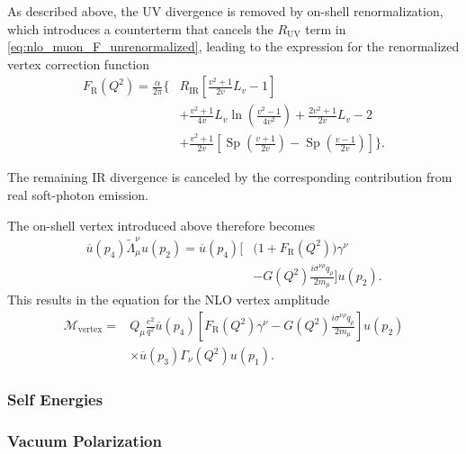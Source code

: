 As described above, the UV divergence is removed by on-shell renormalization, which introduces a counterterm that cancels the $R_{\mathrm{UV}}$ term in \autoref{eq:nlo_muon_F_unrenormalized}, leading to the expression for the renormalized vertex correction function 
\begin{equation}
\begin{split}
  F_{\mathrm R}(Q^2)=\frac{\alpha}{2\pi}\Bigg\{&
    R_{\mathrm{IR}}\left[
    \frac{v^2+1}{2v}L_v-1\right]\\
  &+\frac{v^2+1}{4v}L_v
    \ln\!\left(\frac{v^2-1}{4v^2}\right)
    +\frac{2v^2+1}{2v}L_v-2\\
  &+\frac{v^2+1}{2v}\left[
    \operatorname{Sp}\!\left(\frac{v+1}{2v}\right)
    -\operatorname{Sp}\!\left(\frac{v-1}{2v}\right)
    \right]\Bigg\}.
\end{split}
\label{eq:nlo_muon_F_renormalized_explicit}
\end{equation}

The remaining IR divergence is canceled by the corresponding contribution from real soft-photon emission.

The on-shell vertex introduced above therefore becomes
\begin{equation}
\begin{split}
  \overline{u}(p_4)\widetilde{\Lambda}^\nu_\mu u(p_2)
  =\overline{u}(p_4)\Bigg[
    &\bigl(1+F_{\mathrm R}(Q^2)\bigr)\gamma^\nu\\
    &-G(Q^2)\frac{i\sigma^{\nu\rho}q_\rho}{2m_\mu}
  \Bigg]u(p_2).
\end{split}
\label{eq:nlo_muon_vertex_renormalized}
\end{equation}
This results in the equation for the NLO vertex amplitude
\begin{equation}
\begin{split}
  \mathcal{M}_{\mathrm{vertex}}={}&
  Q_\mu\frac{e^2}{q^2}
  \overline{u}(p_4)\left[
  F_{\mathrm R}(Q^2)\gamma^\nu
  -G(Q^2)\frac{i\sigma^{\nu\rho}q_\rho}{2m_\mu}
  \right]u(p_2)\\
  &\times\overline{u}(p_3)\Gamma_\nu(Q^2)u(p_1).
\end{split}
\label{eq:nlo_muon_vertex_amplitude}
\end{equation}



\subsubsection{Self Energies}
\subsubsection{Vacuum Polarization}
